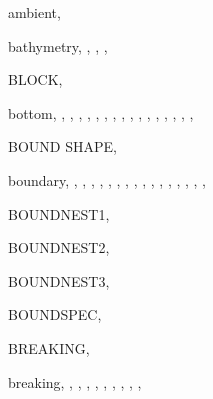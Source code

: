\documentclass[12pt]{book}
\begin{document}
\begin{theindex}
  \item ambient, 

  \indexspace

  \item bathymetry, , , ,
  \item BLOCK, 
  \item bottom, , , ,
		, , ,
		, , ,
		, ,
		, ,
		, , ,
  \item BOUND SHAPE, 
  \item boundary, , , ,
		, , ,
		, , ,
		, , ,
		, , ,
		, 
  \item BOUNDNEST1, 
  \item BOUNDNEST2, 
  \item BOUNDNEST3, 
  \item BOUNDSPEC, 
  \item BREAKING, 
  \item breaking, , , ,
		, , ,
		, , ,

  \indexspace


\end{theindex}
\end{document}
